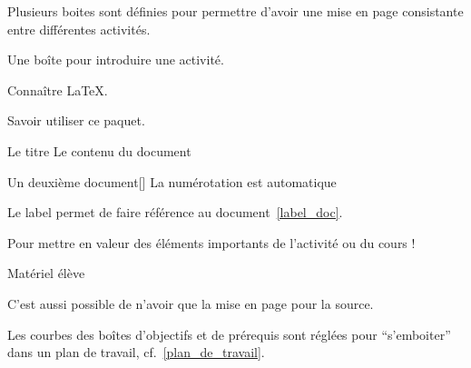 Plusieurs boites sont définies pour permettre d'avoir une mise en page consistante entre différentes activités.
\begin{boiteCodeTex}{}
  \begin{contexte}
    Une boîte pour introduire une activité.
  \end{contexte}

  \begin{prerequis}
    \item Connaître LaTeX.
  \end{prerequis}

  \begin{objectifs}
    \item Savoir utiliser ce paquet.
  \end{objectifs}

  \begin{doc}{Le titre}
    Le contenu du document
  \end{doc}

  \begin{doc}{Un deuxième document}[\label{label_doc}]
    La numérotation est automatique
  \end{doc}
  Le label permet de faire référence au document~\ref{label_doc}.

  \begin{importants}
    Pour mettre en valeur des éléments importants de l'activité ou du cours !
  \end{importants}

  \begin{boiteMateriel}{Matériel élève}
  \end{boiteMateriel}

  C'est aussi possible de n'avoir que la mise en page pour la source.
\end{boiteCodeTex}

Les courbes des boîtes d'objectifs et de prérequis sont réglées pour ``s'emboiter'' dans un plan de travail, cf.~\ref{plan_de_travail}.

